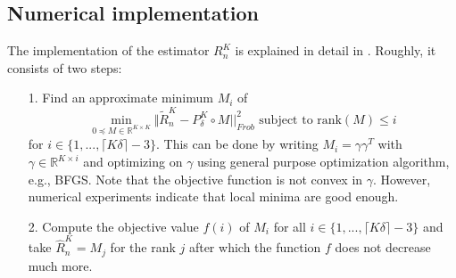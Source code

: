\documentclass[10pt, a4paper]{report}
\newcommand{\R}[0]{\mathbb{R}}
\theoremstyle{definition}
\theoremstyle{remark}
\begin{document}
\subsection{Numerical implementation}
The implementation of the estimator $R^K_n$ is explained in detail in \cite[Section 5]{DP2}. Roughly, it consists of two steps:
\begin{itemize}
	\item[1.] Find an approximate minimum $M_i$ of 
	$$\min_{0\preceq M \in \R^{K\times K}} \Vert \tilde{R}_n^K - P_{\delta}^K \circ M||^2_{Frob} \text{ subject to rank}(M)\leq i $$ 
	for $i \in \{1,...,\lceil K\delta\rceil-3 \}$. This can be done by writing $M_i = \gamma \gamma^T$ with $\gamma \in \R^{K\times i}$ and optimizing on $\gamma$ using general purpose optimization algorithm, e.g., BFGS. Note that the objective function is not convex in $\gamma$. However, numerical experiments indicate that local minima are good enough.
	\item[2.] Compute the objective value $f(i)$ of $M_i$ for all $i \in \{1,...,\lceil K\delta\rceil-3 \}$ and take $\hat{R}_n^K = M_j$ for the rank $j$ after which the function $f$ does not decrease much more.
\end{itemize}
\end{document}
